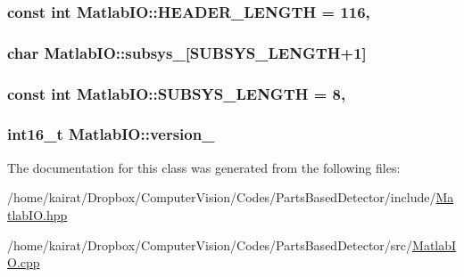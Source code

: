 \subsubsection[{H\+E\+A\+D\+E\+R\+\_\+\+L\+E\+N\+G\+T\+H}]{\setlength{\rightskip}{0pt plus 5cm}const int Matlab\+I\+O\+::\+H\+E\+A\+D\+E\+R\+\_\+\+L\+E\+N\+G\+T\+H = 116\hspace{0.3cm}{\ttfamily [static]}, {\ttfamily [private]}}\label{classMatlabIO_af3e7951c954c76a502fe917a5438f102}
\hypertarget{classMatlabIO_a14f39bfe5a3e5877a606d2e176444b81}{}
\subsubsection[{subsys\+\_\+}]{\setlength{\rightskip}{0pt plus 5cm}char Matlab\+I\+O\+::subsys\+\_\+\mbox{[}{\bf S\+U\+B\+S\+Y\+S\+\_\+\+L\+E\+N\+G\+T\+H}+1\mbox{]}\hspace{0.3cm}{\ttfamily [private]}}\label{classMatlabIO_a14f39bfe5a3e5877a606d2e176444b81}
\hypertarget{classMatlabIO_a0c4219a61f9d82ce15e309bfce18bab9}{}
\subsubsection[{S\+U\+B\+S\+Y\+S\+\_\+\+L\+E\+N\+G\+T\+H}]{\setlength{\rightskip}{0pt plus 5cm}const int Matlab\+I\+O\+::\+S\+U\+B\+S\+Y\+S\+\_\+\+L\+E\+N\+G\+T\+H = 8\hspace{0.3cm}{\ttfamily [static]}, {\ttfamily [private]}}\label{classMatlabIO_a0c4219a61f9d82ce15e309bfce18bab9}
\hypertarget{classMatlabIO_a73155405392e0c20d5098f462ebf405d}{}
\subsubsection[{version\+\_\+}]{\setlength{\rightskip}{0pt plus 5cm}int16\+\_\+t Matlab\+I\+O\+::version\+\_\+\hspace{0.3cm}{\ttfamily [private]}}\label{classMatlabIO_a73155405392e0c20d5098f462ebf405d}


The documentation for this class was generated from the following files\+:\begin{DoxyCompactItemize}
\item 
/home/kairat/\+Dropbox/\+Computer\+Vision/\+Codes/\+Parts\+Based\+Detector/include/\hyperlink{MatlabIO_8hpp}{Matlab\+I\+O.\+hpp}\item 
/home/kairat/\+Dropbox/\+Computer\+Vision/\+Codes/\+Parts\+Based\+Detector/src/\hyperlink{MatlabIO_8cpp}{Matlab\+I\+O.\+cpp}\end{DoxyCompactItemize}
